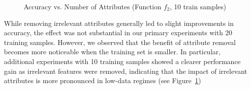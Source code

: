 \begin{figure}[htbp]
    \centering
    \caption{Accuracy vs. Number of Attributes (Function $f_2$, 10 train samples)}
    \label{fig:f2-10samples-results}
\end{figure}

While removing irrelevant attributes generally led to slight improvements in accuracy, the effect was not
substantial in our primary experiments with 20 training samples.
However, we observed that the benefit of attribute removal becomes more noticeable when the training set is
smaller.
In particular, additional experiments with 10 training samples showed a clearer performance gain as
irrelevant features were removed, indicating that the impact of irrelevant attributes is more pronounced in
low-data regimes (see Figure~\ref{fig:f2-10samples-results})

